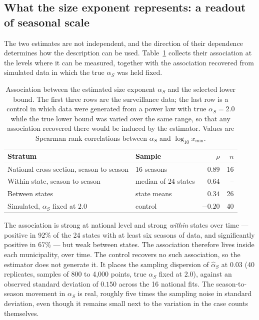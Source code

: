 \documentclass[english,10pt,b5paper]{article}
\begin{document}
\subsection{What the size exponent represents: a readout of seasonal scale}
\label{sec:coupling}

The two estimates are not independent, and the direction of their dependence
determines how the description can be used. Table~\ref{tab:coupling} collects
their association at the levels where it can be measured, together with the
association recovered from simulated data in which the true $\alpha_S$ was held
fixed.

\begin{table}[htbp]
\centering
\small
\setlength{\tabcolsep}{4pt}
\caption{Association between the estimated size exponent $\alpha_S$ and the
selected lower bound. The first three rows are the surveillance data; the last row
is a control in which data were generated from a power law with true
$\alpha_S=2.0$ while the true lower bound was varied over the same range, so that
any association recovered there would be induced by the estimator. Values are
Spearman rank correlations between $\alpha_S$ and $\log_{10} x_{\min}$.}
\label{tab:coupling}
\begin{tabular}{@{}llrr@{}}
\toprule
Stratum & Sample & $\rho$ & $n$\\
\midrule
National cross-section, season to season & 16 seasons            & $0.89$ & 16\\
Within state, season to season           & median of 24 states   & $0.64$ & --\\
Between states                           & state means           & $0.34$ & 26\\
\midrule
Simulated, $\alpha_S$ fixed at $2.0$    & control               & $-0.20$ & 40\\
\bottomrule
\end{tabular}
\end{table}

The association is strong at national level and strong \emph{within} states
over time --- positive in 92\% of the 24 states with at least six seasons of
data, and significantly positive in 67\% --- but weak between states. The
association therefore lives inside each municipality, over time. The control
recovers no such association, so the estimator does not generate it. It places
the sampling dispersion of $\hat\alpha_S$ at $0.03$ (40 replicates, samples of
800 to 4{,}000 points, true $\alpha_S$ fixed at $2.0$), against an observed
standard deviation of $0.150$ across the 16 national fits. The
season-to-season movement in $\alpha_S$ is real, roughly five times the
sampling noise in standard deviation, even though it remains small next to the
variation in the case counts themselves.
\end{document}

